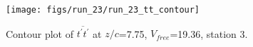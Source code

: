 \begin{figure}[H]
\centering
\texttt{[image: figs/run\_23/run\_23\_tt\_contour]}
\caption{Contour plot of $\overline{t^\prime t^\prime}$ at $z/c$=7.75, $V_{free}$=19.36, station 3.}
\label{fig:run_23_tt_contour}
\end{figure}


